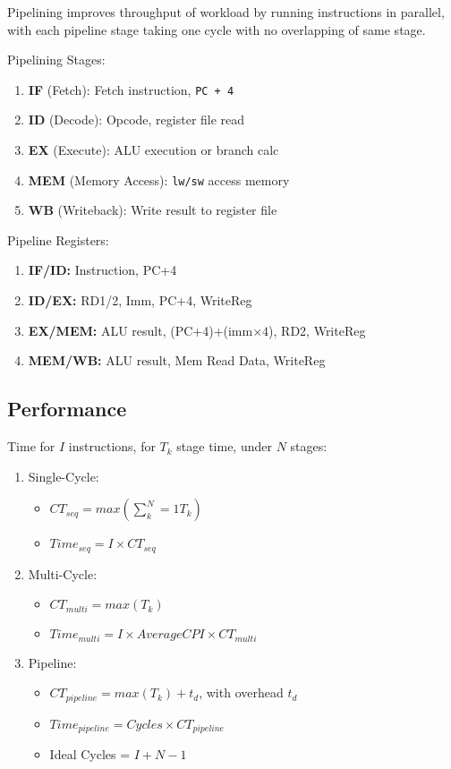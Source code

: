 \documentclass[12pt, a4paper]{article}
\begin{document}
\begin{multicols*}{3}
Pipelining improves throughput of workload by running instructions in parallel, with each pipeline stage taking one cycle with no overlapping of same stage.

Pipelining Stages:
\begin{enumerate}[\roman*.]
  \item \textbf{IF} (Fetch): Fetch instruction, \lstinline|PC + 4|
  \item \textbf{ID} (Decode): Opcode, register file read 
  \item \textbf{EX} (Execute): ALU execution or branch calc
  \item \textbf{MEM} (Memory Access): \lstinline|lw/sw| access memory
  \item \textbf{WB} (Writeback): Write result to register file
\end{enumerate}

Pipeline Registers:
\begin{enumerate}[\roman*.]
  \item \textbf{IF/ID:} Instruction, PC+4
  \item \textbf{ID/EX:} RD1/2, Imm, PC+4, WriteReg
  \item \textbf{EX/MEM:} ALU result, (PC+4)+(imm$\times 4$), RD2, WriteReg
  \item \textbf{MEM/WB:} ALU result, Mem Read Data, WriteReg
\end{enumerate}

\subsection{Performance}

Time for $I$ instructions, for $T_k$ stage time, under $N$ stages:
\begin{enumerate}[\roman*.]
  \item Single-Cycle:
    \begin{itemize}[leftmargin=*]
    \item $CT_{seq} = max(\sum^N_k=1 T_k)$
    \item $Time_{seq} = I \times CT_{seq}$
  \end{itemize}
  \item Multi-Cycle:
  \begin{itemize}[leftmargin=*]
    \item $CT_{multi} = max(T_k)$
    \item $Time_{multi} = I \times Average CPI \times CT_{multi}$
  \end{itemize}
  \item Pipeline:
  \begin{itemize}[leftmargin=*]
    \item $CT_{pipeline} = max(T_k) + t_d$, with overhead $t_d$
    \item $Time_{pipeline} = Cycles \times CT_{pipeline}$
    \item Ideal Cycles = $I + N - 1$
  \end{itemize}
\end{enumerate}


\end{multicols*}
\end{document}
